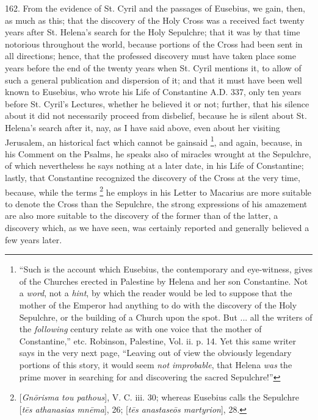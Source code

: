 162.
From the evidence of St. Cyril and the passages of Eusebius, we gain,
then, as much as this; that the discovery of the Holy Cross was a
received fact twenty years after St. Helena's search for the Holy
Sepulchre; that it was by that time notorious throughout the world,
because portions of the Cross had been sent in all directions; hence,
that the professed discovery must have taken place some years before
the end of the twenty years when St. Cyril mentions it, to allow of
such a general publication and dispersion of it; and that it must have
been well known to Eusebius, who wrote his Life of Constantine A.D.
337, only ten years before St. Cyril's Lectures, whether he believed
it or not; further, that his silence about it did not necessarily
proceed from disbelief, because he is silent about St. Helena's search
after it, nay, as I have said above, even about her visiting
Jerusalem, an historical fact which cannot be gainsaid \footnote{``Such is the account which Eusebius, the contemporary and eye-witness,
gives of the Churches erected in Palestine by Helena and her son
Constantine. Not a \emph{word}, not a \emph{hint}, by which the reader
would be led to suppose that the mother of the Emperor had anything to
do with the discovery of the Holy Sepulchre, or the building of a
Church upon the spot. But ... all the writers of the \emph{following}
century relate as with one voice that the mother of Constantine,'' etc.
Robinson, Palestine, Vol. ii. p. 14. Yet this same writer says in the
very next page, ``Leaving out of view the obviously legendary portions
of this story, it would seem \emph{not improbable}, that Helena \emph{was}
the prime mover in searching for and discovering the sacred Sepulchre!''}, and again, because, in his Comment on the Psalms, he
speaks also of miracles wrought at the Sepulchre, of which
nevertheless he says nothing at a later date, in his Life of
Constantine; lastly, that Constantine recognized the discovery of the
Cross at the very time, because, while the terms \footnote{[\emph{Gn\={o}risma tou pathous}], V. C. iii. 30; whereas Eusebius
calls the Sepulchre [\emph{t\={e}s athanasias mn\={e}ma}], 26; [\emph{t\={e}s
anastase\={o}s martyrion}], 28.} he employs in his Letter to Macarius are more suitable to
denote the Cross than the Sepulchre, the strong expressions of his
amazement are also more suitable to the discovery of the former than
of the latter, a discovery which, as we have seen, was certainly
reported and generally believed a few years later.

